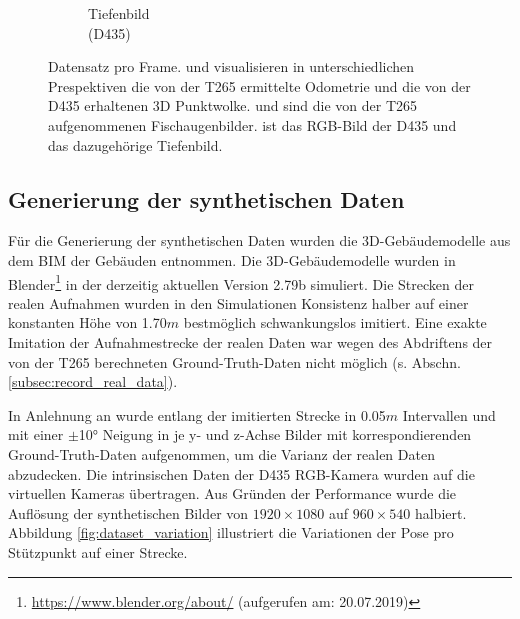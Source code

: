 \begin{figure}
\begin{subfigure}[t]{0.3\linewidth}
		\caption{Tiefenbild \\ (D435) \hspace*{2cm}}
		\label{subfig:depth-image}
	\end{subfigure}
	\caption{Datensatz pro Frame.   und  visualisieren in unterschiedlichen Prespektiven die von der T265 ermittelte Odometrie und die von der D435 erhaltenen 3D Punktwolke.  und  sind die von der T265 aufgenommenen Fischaugenbilder.  ist das RGB-Bild der D435 und  das dazugehörige Tiefenbild. }
	\label{fig:dataset}
\end{figure}

\subsection{Generierung der synthetischen Daten}
\label{subsec:generate_synth_images}
Für die Generierung der synthetischen Daten wurden die 3D-Gebäudemodelle  aus dem BIM der Gebäuden entnommen. Die 3D-Gebäudemodelle wurden in Blender\footnote{\url{https://www.blender.org/about/} (aufgerufen am: 20.07.2019)} in der derzeitig aktuellen Version 2.79b simuliert. Die Strecken der realen Aufnahmen wurden in den Simulationen Konsistenz halber auf einer konstanten Höhe von 1.70$m$ bestmöglich schwankungslos imitiert. Eine exakte Imitation der Aufnahmestrecke der realen Daten war wegen des Abdriftens der von der T265 berechneten Ground-Truth-Daten nicht möglich (s. Abschn. \ref{subsec:record_real_data}).

In Anlehnung an \citet{acharyaBIMPoseNetIndoorCamera2019} wurde entlang der imitierten Strecke in 0.05$m$ Intervallen und mit einer $\pm$10° Neigung in je y- und z-Achse Bilder mit korrespondierenden Ground-Truth-Daten aufgenommen, um die Varianz der realen Daten abzudecken. Die intrinsischen Daten der D435 RGB-Kamera wurden auf die virtuellen Kameras übertragen. Aus Gründen der Performance wurde die Auflösung der synthetischen Bilder von $1920\times1080$ auf  $960\times540$ halbiert. Abbildung \ref{fig:dataset_variation} illustriert die Variationen der Pose pro Stützpunkt auf einer Strecke.


